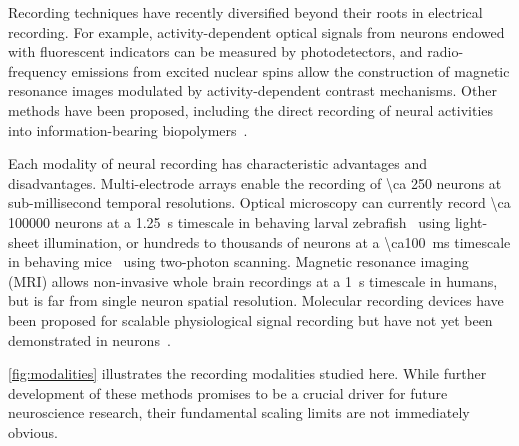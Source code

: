 Recording techniques have recently diversified beyond their roots in electrical recording.
For example, activity-dependent optical signals from neurons endowed with fluorescent indicators can be measured by photodetectors, and radio-frequency emissions from excited nuclear spins allow the construction of magnetic resonance images modulated by activity-dependent contrast mechanisms.
Other methods have been proposed, including the direct recording of neural activities into information-bearing biopolymers~\cite{zamft12,glaser13,kording11a}.

Each modality of neural recording has characteristic advantages and disadvantages.
Multi-electrode arrays enable the recording of \num{\ca 250} neurons at sub-millisecond temporal resolutions.
Optical microscopy can currently record \num{\ca 100000} neurons at a \SI{1.25}{\second} timescale in behaving larval zebrafish~\cite{ahrens13} using light-sheet illumination, or hundreds to thousands of neurons at a \SI{\ca100}{\milli\second} timescale in behaving mice~\cite{ziv13} using two-photon scanning.
Magnetic resonance imaging (MRI) allows non-invasive whole brain recordings at a \SI{1}{\second} timescale in humans, but is far from single neuron spatial resolution.
Molecular recording devices have been proposed for scalable physiological signal recording but have not yet been demonstrated in neurons~\cite{zamft12,glaser13,kording11a}.

\autoref{fig:modalities} illustrates the recording modalities studied here.
While further development of these methods promises to be a crucial driver for future neuroscience research, their fundamental scaling limits are not immediately obvious.

